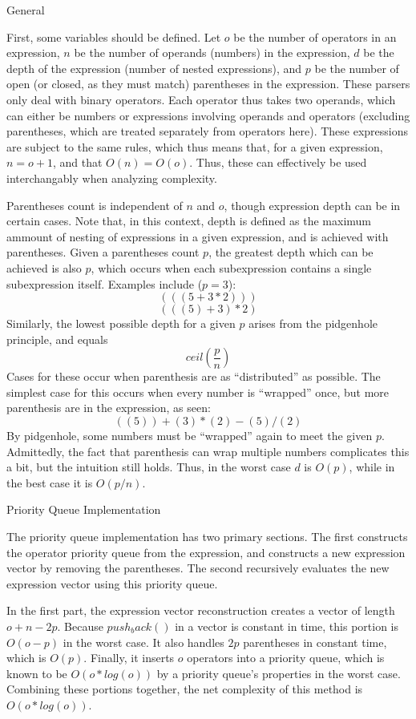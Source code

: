 \documentclass[11pt]{article}
\begin{document}
\centerline{General}
First, some variables should be defined.
Let $o$ be the number of operators in an expression, $n$ be the number of operands (numbers) in the expression, $d$ be the depth of the expression (number of nested expressions), and $p$ be the number of open (or closed, as they must match) parentheses in the expression.
These parsers only deal with binary operators. Each operator thus takes two operands, which can either be numbers or expressions involving operands and operators (excluding parentheses, which are treated separately from operators here).
These expressions are subject to the same rules, which thus means that, for a given expression, $n=o+1$, and that $O(n)=O(o)$.
Thus, these can effectively be used interchangably when analyzing complexity.

Parentheses count is independent of $n$ and $o$, though expression depth can be in certain cases.
Note that, in this context, depth is defined as the maximum ammount of nesting of expressions in a given expression, and is achieved with parentheses.
Given a parentheses count $p$, the greatest depth which can be achieved is also $p$, which occurs when each subexpression contains a single subexpression itself.
Examples include ($p=3$):
\[(((5 + 3 * 2)))\]
\[(((5) + 3 )* 2)\]
Similarly, the lowest possible depth for a given $p$ arises from the pidgenhole principle, and equals 
\[ ceil(\frac {p} {n}) \]
Cases for these occur when parenthesis are as ``distributed'' as possible.
The simplest case for this occurs when every number is ``wrapped'' once, but more parenthesis are in the expression, as seen:
\[((5)) + (3) * (2) - (5) / (2)\]
By pidgenhole, some numbers must be ``wrapped'' again to meet the given $p$.
Admittedly, the fact that parenthesis can wrap multiple numbers complicates this a bit, but the intuition still holds.
Thus, in the worst case $d$ is $O(p)$, while in the best case it is $O(p/n)$.

\centerline{Priority Queue Implementation}
The priority queue implementation has two primary sections.
The first constructs the operator priority queue from the expression, and constructs a new expression vector by removing the parentheses.
The second recursively evaluates the new expression vector using this priority queue.

In the first part, the expression vector reconstruction creates a vector of length $o + n - 2 p$.
Because $push_back()$ in a vector is constant in time, this portion is $O(o-p)$ in the worst case.
It also handles $2p$ parentheses in constant time, which is $O(p)$.
Finally, it inserts $o$ operators into a priority queue, which is known to be $O(o*log(o))$ by a priority queue's properties in the worst case.
Combining these portions together, the net complexity of this method is $O(o*log(o))$.
\end{document}
